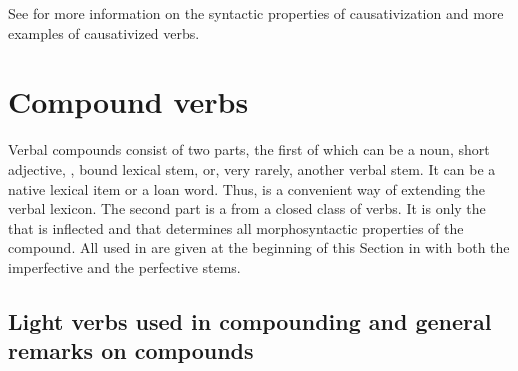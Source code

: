 See  for more information on the syntactic properties of causativization and more examples of causativized verbs.

\section{Compound verbs}
\label{sec:Compound verbs}
Verbal compounds consist of two parts, the first of which can be a noun, short adjective, , bound lexical stem, or, very rarely, another verbal stem. It can be a native lexical item or a loan word. Thus,  is a convenient way of extending the verbal lexicon. The second part is a  from a closed class of verbs. It is only the  that is inflected and that determines all morphosyntactic properties of the compound. All  used in  are given at the beginning of this Section in  with both the imperfective and the perfective stems.


\subsection{Light verbs used in compounding and general remarks on compounds}
\label{sec:Light verbs used in compounding and general remarks on compounds}

